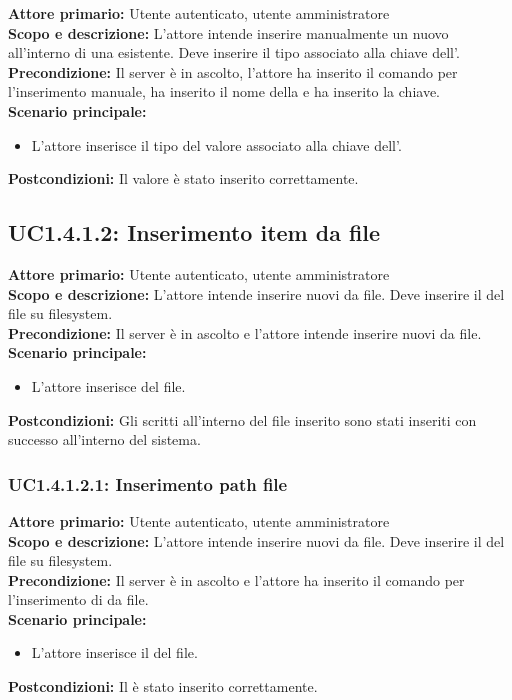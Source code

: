\documentclass{scalatekids-article}
\begin{document}
\textbf{Attore primario:} Utente autenticato, utente amministratore\\
\textbf{Scopo e descrizione:} L'attore intende inserire manualmente un nuovo  all'interno di una  esistente. Deve inserire il tipo associato alla chiave dell'.\\
\textbf{Precondizione:} Il server è in ascolto, l'attore ha inserito il comando per l'inserimento  manuale, ha inserito il nome della  e ha inserito la chiave.\\
\textbf{Scenario principale:}
\begin{itemize}
\item L'attore inserisce il tipo del valore associato alla chiave dell'.
\end{itemize}
\textbf{Postcondizioni:} Il valore è stato inserito correttamente.

\subsection{UC1.4.1.2: Inserimento item da file}

\textbf{Attore primario:} Utente autenticato, utente amministratore\\
\textbf{Scopo e descrizione:} L'attore intende inserire nuovi  da file. Deve inserire il  del file su filesystem.\\
\textbf{Precondizione:} Il server è in ascolto e l'attore intende inserire nuovi  da file.\\
\textbf{Scenario principale:}
\begin{itemize}
\item L'attore inserisce  del file.
\end{itemize}
\textbf{Postcondizioni:} Gli  scritti all'interno del file inserito sono stati inseriti con successo all'interno del sistema.%

\subsubsection{UC1.4.1.2.1: Inserimento path file}

\textbf{Attore primario:} Utente autenticato, utente amministratore\\
\textbf{Scopo e descrizione:} L'attore intende inserire nuovi  da file. Deve inserire il  del file su filesystem.\\
\textbf{Precondizione:} Il server è in ascolto e l'attore ha inserito il comando per l'inserimento di  da file.\\
\textbf{Scenario principale:}
\begin{itemize}
\item L'attore inserisce il  del file.
\end{itemize}
\textbf{Postcondizioni:} Il  è stato inserito correttamente.
\end{document}
